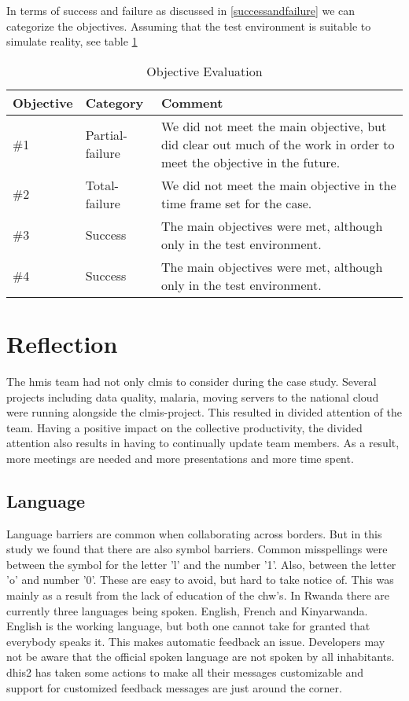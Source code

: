 In terms of success and failure as discussed in \ref{successandfailure} we can categorize the objectives. Assuming that the test environment is suitable to simulate reality, see table \ref{tab:obev}
\begin{table}
\centering
\begin{tabular}{p{2cm} p{3cm} p{6cm}}
\textbf{Objective} & \textbf{Category} & \textbf{Comment} \\
\hline
\hline
\#1 
& Partial-failure 
& We did not meet the main objective, but did clear out much of the work in order to meet the objective in the future.
\\
\hline
\#2 
& Total-failure 
& We did not meet the main objective in the time frame set for the case.
\\
\hline
\#3 
& Success 
& The main objectives were met, although only in the test environment.
\\
\hline
\#4 
& Success 
& The main objectives were met, although only in the test environment.
\\
\hline
\end{tabular}
\caption{Objective Evaluation}
\label{tab:obev}
\end{table}


\section{Reflection}
The \gls{hmis} team had not only \gls{clmis} to consider during the case study.
Several projects including data quality, malaria, moving servers to the national cloud were running alongside the \gls{clmis}-project. This resulted in divided attention of the team.
Having a positive impact on the collective productivity, the divided attention also results in having to continually update team members. As a result, more meetings are needed and more presentations and more time spent. 
\subsection{Language}
Language barriers are common when collaborating across borders. But in this study we found that there are also symbol barriers.
Common misspellings were between the symbol for the letter 'l' and the number '1'.
Also, between the letter 'o' and number '0'. 
These are easy to avoid, but hard to take notice of.
This was mainly as a result from the lack of education of the \gls{chw}'s. 
In Rwanda there are currently three languages being spoken. English, French and Kinyarwanda.
English is the working language, but both one cannot take for granted that everybody speaks it.
This makes automatic feedback an issue. Developers may not be aware that the official spoken language are not spoken by all inhabitants.
\gls{dhis2} has taken some actions to make all their messages customizable and support for customized feedback messages are just around the corner.

